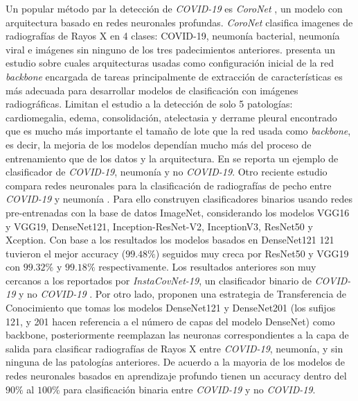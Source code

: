 Un popular método par la detección de \textit{COVID-19} es \textit{CoroNet} \cite{wang2020covid}, un
modelo con arquitectura basado en redes neuronales profundas. \textit{CoroNet} clasifica imagenes de
radiografías de Rayos X en 4 clases: COVID-19, neumonía bacterial, neumonía viral e imágenes sin
ninguno de los tres padecimientos anteriores. \citeauthor{bressem2020comparing} presenta un estudio
sobre cuales arquitecturas usadas como configuración inicial de la red \textit{backbone} encargada
de tareas principalmente de extracción de características es más adecuada para desarrollar modelos
de clasificación con imágenes radiográficas. Limitan el estudio a la detección de solo 5 patologías:
cardiomegalia, edema, consolidación, atelectasia y derrame pleural encontrado que es mucho más
importante el tamaño de lote que la red usada como \textit{backbone}, es decir, la mejoria de los
modelos dependían mucho más del proceso de entrenamiento que de los datos y la arquitectura.
En \cite{zhong2021deep} se reporta un ejemplo de clasificador de \textit{COVID-19}, neumonía y
no \textit{COVID-19}. Otro reciente estudio compara redes neuronales para la clasificación de
radiografías de pecho entre \textit{COVID-19} y neumonía \cite{shazia2021comparative}. Para ello
construyen clasificadores binarios usando redes pre-entrenadas con la base de datos ImageNet,
considerando los modelos VGG16 y VGG19, DenseNet121, Inception-ResNet-V2, InceptionV3, ResNet50 y
Xception. Con base a los resultados los modelos basados en DenseNet121 121 tuvieron el mejor
accuracy ($99.48\%$) seguidos muy creca por ResNet50 y VGG19 con $99.32\%$ y $99.18\%$
respectivamente. Los resultados anteriores son muy cercanos a los reportados por
\textit{InstaCovNet-19}, un clasificador binario de \textit{COVID-19} y no \textit{COVID-19}
\cite{gupta2021instacovnet}. Por otro lado, \citeauthor{bassi2021deep} proponen una estrategia de
Transferencia de Conocimiento que tomas los modelos DenseNet121 y DenseNet201 (los sufijos 121, y 201
hacen referencia a el número de capas del modelo DenseNet) como backbone, posteriormente reemplazan
las neuronas correspondientes a la capa de salida para clasificar radiografías de Rayos X entre
\textit{COVID-19}, neumonía, y sin ninguna de las patologías anteriores. De acuerdo a
\citeauthor{shoeibi2020automated} la mayoria de los modelos de redes neuronales basados en aprendizaje
profundo tienen un accuracy dentro del $90\%$ al $100\%$ para clasificación binaria entre
\textit{COVID-19} y no \textit{COVID-19}.

